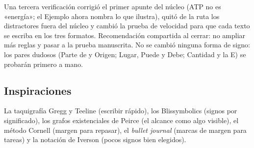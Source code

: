 Una tercera verificación corrigió el primer apunte del núcleo (ATP no es
«energía»; el Ejemplo ahora nombra lo que ilustra), quitó de la ruta los
distractores fuera del núcleo y cambió la prueba de velocidad para que cada
texto se escriba en los tres formatos. Recomendación compartida al cerrar:
no ampliar más reglas y pasar a la prueba manuscrita.
No se cambió ninguna forma de signo: los pares dudosos (Parte de y Origen;
Lugar, Puede y Debe; Cantidad y la E) se probarán primero a mano.

\subsection{Inspiraciones}
La taquigrafía Gregg y Teeline (escribir rápido), los Blissymbolics (signos
por significado), los grafos existenciales de Peirce (el alcance como algo
visible), el método Cornell (margen para repasar), el \emph{bullet journal}
(marcas de margen para tareas) y la notación de Iverson (pocos signos bien
elegidos).
